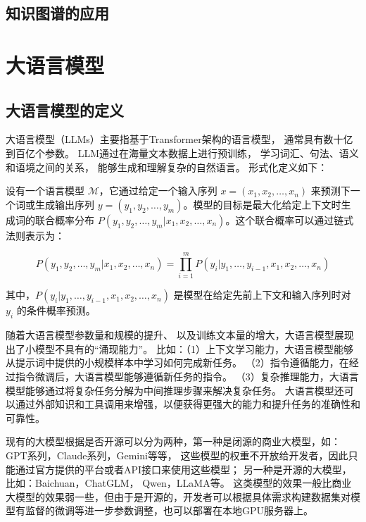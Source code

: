 \subsection{知识图谱的应用}



\section{大语言模型}

\subsection{大语言模型的定义}

大语言模型（LLMs）主要指基于Transformer架构的语言模型，
通常具有数十亿到百亿个参数。
LLM通过在海量文本数据上进行预训练，
学习词汇、句法、语义和语境之间的关系，
能够生成和理解复杂的自然语言。
形式化定义如下：

设有一个语言模型 \( \mathcal{M} \)，它通过给定一个输入序列 \( x = (x_1, x_2, \dots, x_n) \) 来预测下一个词或生成输出序列 \( y = (y_1, y_2, \dots, y_m) \)。模型的目标是最大化给定上下文时生成词的联合概率分布 \( P(y_1, y_2, \dots, y_m | x_1, x_2, \dots, x_n) \)。这个联合概率可以通过链式法则表示为：

\[
P(y_1, y_2, \dots, y_m | x_1, x_2, \dots, x_n) = \prod_{i=1}^{m} P(y_i | y_1, \dots, y_{i-1}, x_1, x_2, \dots, x_n)
\]

其中，\( P(y_i | y_1, \dots, y_{i-1}, x_1, x_2, \dots, x_n) \) 是模型在给定先前上下文和输入序列时对 \( y_i \) 的条件概率预测。

随着大语言模型参数量和规模的提升、
以及训练文本量的增大，大语言模型展现出了小模型不具有的“涌现能力”。
比如：（1）上下文学习能力，大语言模型能够从提示词中提供的小规模样本中学习如何完成新任务。
（2）指令遵循能力，在经过指令微调后，大语言模型能够遵循新任务的指令。
（3）复杂推理能力，大语言模型能够通过将复杂任务分解为中间推理步骤来解决复杂任务。
大语言模型还可以通过外部知识和工具调用来增强，以便获得更强大的能力和提升任务的准确性和可靠性。

现有的大模型根据是否开源可以分为两种，第一种是闭源的商业大模型，如：GPT系列\cite{achiam2023gpt, OpenAI2023}，Claude系列\cite{anthropic2023claude3}，Gemini\cite{team2023gemini, team2024gemini}等等，
这些模型的权重不开放给开发者，因此只能通过官方提供的平台或者API接口来使用这些模型；
另一种是开源的大模型，比如：Baichuan\cite{Yang2023}，ChatGLM\cite{Zeng2023}，
Qwen\cite{yang2024qwen2}，LLaMA\cite{Touvron2023}等。
这类模型的效果一般比商业大模型的效果弱一些，但由于是开源的，开发者可以根据具体需求构建数据集对模型有监督的微调等进一步参数调整，也可以部署在本地GPU服务器上。

